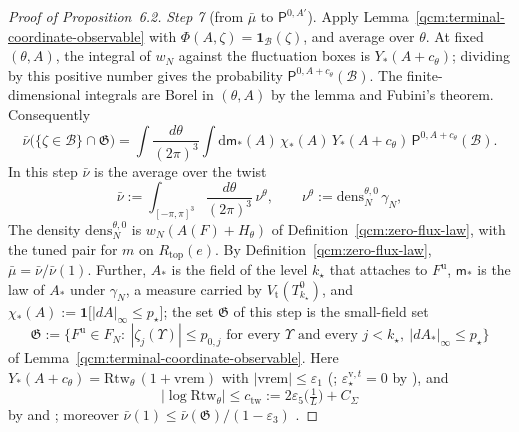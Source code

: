 \documentclass[11pt,letterpaper,reqno]{amsart}
\theoremstyle{definition}
\begin{document}
\begin{proof}[Proof of Proposition~6.2]
\emph{Step 7} (from $\bar\mu$ to $\mathsf P^{0,A'}$).
Apply Lemma~\ref{qcm:terminal-coordinate-observable} with $\Phi(A,\zeta)=\mathbf1_{\mathcal B}(\zeta)$, and average over $\theta$. At fixed $(\theta,A)$, the integral of $w_N$ against the fluctuation boxes is $Y_*(A+c_\theta)$; dividing by this positive number gives the probability $\mathsf P^{0,A+c_\theta}(\mathcal B)$. The finite-dimensional integrals are Borel in $(\theta,A)$ by the lemma and Fubini's theorem. Consequently
\begin{equation*}
\bar\nu\bigl(\{\zeta\in\mathcal B\}\cap\mathfrak G\bigr)=\int\frac{d\theta}{(2\pi)^3}\int\mathrm d\mathsf m_*(A)\,\chi_*(A)\,Y_*(A+c_\theta)\,\mathsf P^{0,A+c_\theta}(\mathcal B).
\end{equation*}
In this step $\bar\nu$ is the average over the twist
\begin{equation*}
\bar\nu:=\int_{[-\pi,\pi]^3}\frac{d\theta}{(2\pi)^3}\,\nu^\theta,\qquad\nu^\theta:=\mathrm{dens}^{\theta,0}_N\,\gamma_N,
\end{equation*}
The density $\mathrm{dens}^{\theta,0}_N$ is $w_N(A(F)+H_\theta)$ of Definition~\ref{qcm:zero-flux-law}, with the tuned pair for $m$ on $R_{\mathrm{top}}(e)$.
By Definition~\ref{qcm:zero-flux-law}, $\bar\mu=\bar\nu/\bar\nu(1)$.
Further, $A_*$ is the field of the level $k_\star$ that \cite[Section~22.1, Proposition~22.1]{QEDConstruction} attaches to $F^{\mathrm u}$, $\mathsf m_*$ is the law of $A_*$ under $\gamma_N$, a measure carried by $V_{\mathrm t}(T^0_{k_\star})$, and $\chi_*(A):=\mathbf 1\bigl[|dA|_\infty\le p_\star\bigr]$;
the set $\mathfrak G$ of this step is the small-field set
\begin{equation*}
\mathfrak G:=\bigl\{F^{\mathrm u}\in F_N:\ |\zeta_j(\Upsilon)|\le p_{0,j}\text{ for every }\Upsilon\text{ and every }j<k_\star,\ |dA_*|_\infty\le p_\star\bigr\}
\end{equation*}
of Lemma~\ref{qcm:terminal-coordinate-observable}.
Here $Y_*(A+c_\theta)=\mathrm{Rtw}_\theta\,(1+\mathrm{vrem})$ with $|\mathrm{vrem}|\le\varepsilon_1$ (\cite[Proposition~10.4, Theorem~22.2 and Proposition~22.6]{QEDConstruction}; $\varepsilon^{\mathrm v,t}_\star=0$ by \cite[Theorem~16.3]{QEDConstruction}), and
\begin{equation*}
|\log\mathrm{Rtw}_\theta|\le c_{\mathrm{tw}}:=2\varepsilon_5\bigl(\tfrac1L\bigr)+C_\Sigma
\end{equation*}
by \cite[Propositions~22.4--22.5]{QEDConstruction} and \cite[Proposition~16.1 and Sections~15--16]{QEDConstruction};
moreover $\bar\nu(1)\le\bar\nu(\mathfrak G)/(1-\varepsilon_3)$ \cite[Proposition~22.7, equation~(22.45)]{QEDConstruction}.

\end{proof}
\end{document}
